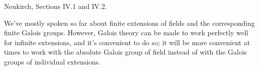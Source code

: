 %
%
%
%
%
%
%

Neukirch, Sections IV.1 and IV.2.

\medskip

We've mostly spoken so far about finite extensions of fields and
the corresponding finite Galois groups. However, Galois theory can be made
to work perfectly well for infinite extensions, and it's convenient to do so;
it will be more convenient at times to work with the absolute Galois group
of field instead of with the Galois groups of individual extensions.

